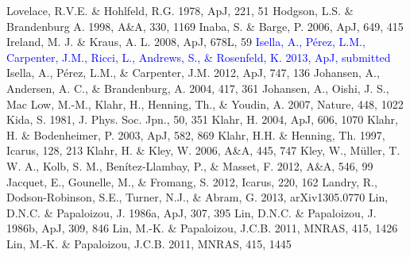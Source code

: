 \documentclass[apj]{emulateapj}
\def\blue#1{\textcolor{blue}{#1}}
\begin{document}
\begin{thebibliography}{}
  Lovelace, R.V.E. \& Hohlfeld, R.G. 1978, ApJ, 221, 51
 Hodgson, L.S. \& Brandenburg A. 1998, A\&A, 330, 1169
 Inaba, S. \& Barge, P. 2006, ApJ, 649, 415
 Ireland, M. J. \& Kraus, A. L. 2008, ApJ, 678L, 59
\bibitem[{{\blue{Isella et al.}}(2013)}]{Isella13} \blue{Isella, A., P\'erez, L.M., Carpenter, J.M., Ricci, L., Andrews, S., \& Rosenfeld, K. 2013, ApJ, submitted}
 Isella, A., P\'erez, L.M., \& Carpenter, J.M. 2012, ApJ, 747, 136
 Johansen, A., Andersen, A. C., \& Brandenburg, A. 2004, 417, 361
 Johansen, A., Oishi, J. S., Mac Low, M.-M., Klahr, H., Henning, Th., \& Youdin, A. 2007, Nature, 448, 1022
 Kida, S. 1981, J. Phys. Soc. Jpn.,  50, 351
 Klahr, H. 2004, ApJ, 606, 1070
 Klahr, H. \& Bodenheimer, P. 2003, ApJ, 582, 869
 Klahr, H.H. \& Henning, Th. 1997, Icarus, 128, 213
 Klahr, H. \& Kley, W. 2006, A\&A, 445, 747
 Kley, W., M\"uller, T. W. A., Kolb, S. M., Ben\'itez-Llambay, P., \& Masset, F. 2012, A\&A, 546, 99
 Jacquet, E., Gounelle, M., \& Fromang, S. 2012, Icarus, 220, 162
 Landry, R., Dodson-Robinson, S.E., Turner, N.J., \& Abram, G. 2013, arXiv1305.0770
 Lin, D.N.C. \& Papaloizou, J. 1986a, ApJ, 307, 395
 Lin, D.N.C. \& Papaloizou, J. 1986b, ApJ, 309, 846
 Lin, M.-K. \& Papaloizou, J.C.B. 2011, MNRAS, 415, 1426
 Lin, M.-K. \& Papaloizou, J.C.B. 2011, MNRAS, 415, 1445

\end{thebibliography}
\end{document}
